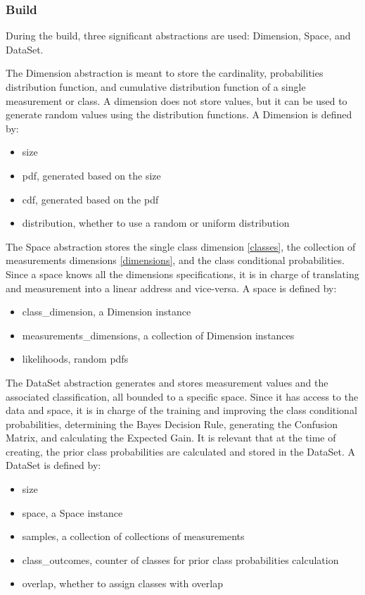 \documentclass[letterpaper, conference]{IEEEtran}
\begin{document}
\subsubsection{Build}

During the build, three significant abstractions are used: Dimension, Space, and DataSet.

The Dimension abstraction is meant to store the cardinality, probabilities distribution function, and cumulative distribution function of a single measurement or class. A dimension does not store values, but it can be used to generate random values using the distribution functions. A Dimension is defined by:

\begin{itemize}
  \item size
  \item pdf, generated based on the size
  \item cdf, generated based on the pdf
  \item distribution, whether to use a random or uniform distribution
\end{itemize}

The Space abstraction stores the single class dimension \ref{classes}, the collection of measurements dimensions \ref{dimensions}, and the class conditional probabilities. Since a space knows all the dimensions specifications, it is in charge of translating and measurement into a linear address and vice-versa. A space is defined by:

\begin{itemize}
\item class\_dimension, a Dimension instance
\item measurements\_dimensions, a collection of Dimension instances
\item likelihoods, random pdfs
\end{itemize}

The DataSet abstraction generates and stores measurement values and the associated classification, all bounded to a specific space. Since it has access to the data and space, it is in charge of the training and improving the class conditional probabilities, determining the Bayes Decision Rule, generating the Confusion Matrix, and calculating the Expected Gain. It is relevant that at the time of creating, the prior class probabilities are calculated and stored in the DataSet. A DataSet is defined by:

\begin{itemize}
\item size
\item space, a Space instance
\item samples, a collection of collections of measurements
\item class\_outcomes, counter of classes for prior class probabilities calculation
\item overlap, whether to assign classes with overlap
\end{itemize}
\end{document}
